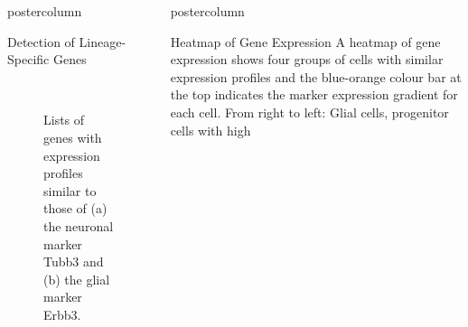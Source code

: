 \documentclass{beamer}
\newlength{\columnheight}
\begin{document}
\begin{frame}
\begin{columns}
\begin{column}{.45\textwidth}
\begin{beamercolorbox}[center]{postercolumn}
\begin{minipage}{.98\textwidth}
{\begin{myblock}{Detection of Lineage-Specific Genes}
\begin{figure}
\begin{minipage}{0.7\textwidth}
	 \\
	\caption{Lists of genes with expression profiles similar to those of
			(a) the neuronal marker Tubb3 and (b) the glial marker Erbb3.}
	\label{fig:genebars}
\end{minipage}
\end{figure}
\end{myblock}\vfill
}\end{minipage}
\end{beamercolorbox}
\end{column}
\begin{column}{.45\textwidth}
\begin{beamercolorbox}[center]{postercolumn}
\begin{minipage}{.98\textwidth}
\parbox[t][\columnheight]{\textwidth}{
\begin{myblock}{Heatmap of Gene Expression }
A heatmap of gene expression shows four groups of cells with similar
expression profiles and the blue-orange colour bar at the top indicates
the marker expression gradient for each cell.
From right to left: Glial cells, progenitor cells with high

\end{myblock}}
\end{minipage}
\end{beamercolorbox}
\end{column}
\end{columns}
\end{frame}
\end{document}
